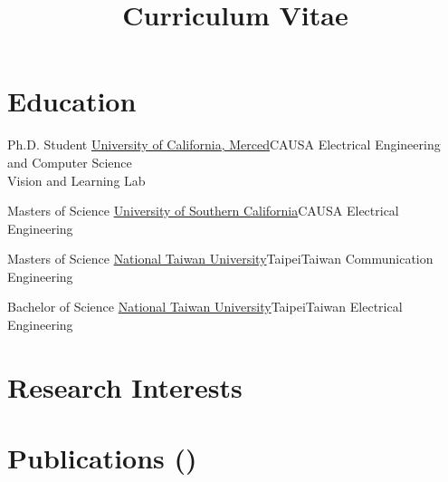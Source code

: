 \documentclass[11pt,letterpaper,sans]{moderncv} %
\title{Curriculum Vitae}
\begin{document}
\makecvtitle %

\vspace{-10mm}
\section{Education}
{Ph.D. Student}
{\href{http://ucmerced.edu/}{University of California, Merced}}{CA}{USA}
{
Electrical Engineering and Computer Science \\
Vision and Learning Lab 
}

{Masters of Science}
{\href{http://www.usc.edu//}{University of Southern California}}{CA}{USA}
{Electrical Engineering}


{Masters of Science}
{\href{http://www.ntu.edu.tw/english/}{National Taiwan University}}{Taipei}{Taiwan}
{Communication Engineering}


{Bachelor of Science}
{\href{http://www.ntu.edu.tw/english/}{National Taiwan University}}{Taipei}{Taiwan}
{Electrical Engineering}


\section{Research Interests}




\section{Publications  \small{ ()}}
\end{document}
